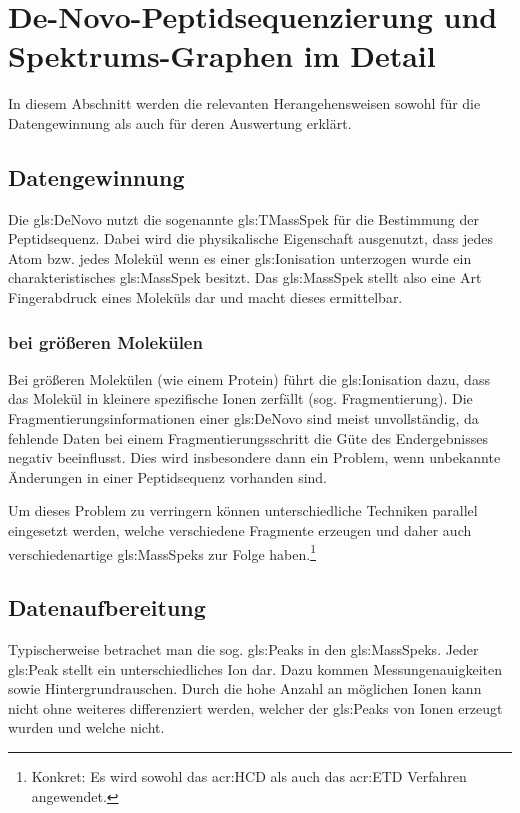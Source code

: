 \documentclass[a4paper, 12pt]{article}
\newcommand{\gerquot}[1]{\glqq#1\grqq}
\newcommand{\dashAndSpace}{\textendash \space}
\begin{document}
\section{De-Novo-Peptidsequenzierung und Spektrums-Graphen im Detail}
In diesem Abschnitt werden die relevanten Herangehensweisen sowohl für die Datengewinnung als auch für deren Auswertung erklärt.

\subsection{Datengewinnung}
Die \gls{gls:DeNovo} nutzt die sogenannte \gls{gls:TMassSpek} für die Bestimmung der Peptidsequenz. Dabei wird die physikalische Eigenschaft ausgenutzt, dass jedes Atom bzw. jedes Molekül \dashAndSpace wenn es einer \gls{gls:Ionisation} unterzogen wurde \dashAndSpace ein charakteristisches \gls{gls:MassSpek} besitzt. Das \gls{gls:MassSpek} stellt also eine Art \gerquot{Fingerabdruck} eines Moleküls dar und macht dieses ermittelbar.


\subsubsection{ bei größeren Molekülen}
Bei größeren Molekülen (wie einem Protein) führt die \gls{gls:Ionisation} dazu, dass das Molekül in kleinere spezifische Ionen zerfällt (sog. Fragmentierung). Die Fragmentierungsinformationen einer \gls{gls:DeNovo} sind meist unvollständig, da fehlende Daten bei einem Fragmentierungsschritt die Güte des Endergebnisses negativ beeinflusst. Dies wird insbesondere dann ein Problem, wenn unbekannte Änderungen in einer Peptidsequenz vorhanden sind.

Um dieses Problem zu verringern können unterschiedliche Techniken parallel eingesetzt werden, welche verschiedene Fragmente erzeugen und daher auch verschiedenartige \glspl{gls:MassSpek} zur Folge haben.\footnote{Konkret: Es wird sowohl das \gls{acr:HCD} als auch das \gls{acr:ETD} Verfahren angewendet.}

\subsection{Datenaufbereitung}
Typischerweise betrachet man die sog. \gerquot{\glspl{gls:Peak}} in den \glspl{gls:MassSpek}. Jeder \gls{gls:Peak} stellt ein unterschiedliches Ion dar. Dazu kommen Messungenauigkeiten sowie Hintergrundrauschen. Durch die hohe Anzahl an möglichen Ionen kann nicht ohne weiteres differenziert werden, welcher der \glspl{gls:Peak} von Ionen erzeugt wurden und welche nicht.
\end{document}
